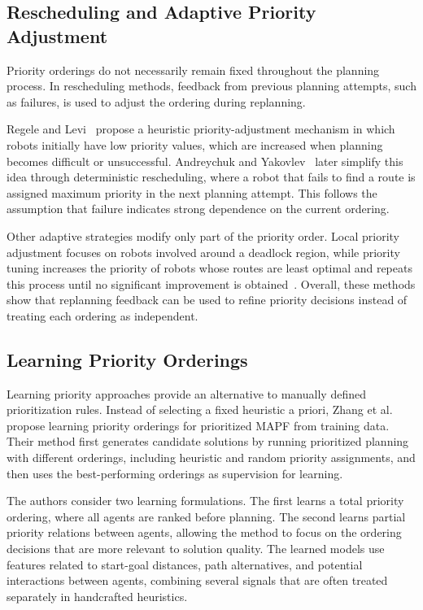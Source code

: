 \subsection{Rescheduling and Adaptive Priority Adjustment}
\hspace{\parindent}
Priority orderings do not necessarily remain fixed throughout the planning process. In rescheduling
methods, feedback from previous planning attempts, such as failures, is used to adjust the ordering during replanning.

Regele and Levi~\cite{regele2006cooperative} propose a heuristic priority-adjustment mechanism in
which robots initially have low priority values, which are increased when planning becomes difficult
or unsuccessful. Andreychuk and Yakovlev~\cite{andreychuk2018two} later simplify this idea through
deterministic rescheduling, where a robot that fails to find a route is assigned maximum priority in
the next planning attempt. This follows the assumption that failure indicates strong dependence on
the current ordering.

Other adaptive strategies modify only part of the priority order. Local priority adjustment focuses
on robots involved around a deadlock region, while priority tuning increases the priority of robots
whose routes are least optimal and repeats this process until no significant improvement is
obtained~\cite{machines2023survey}. Overall, these methods show that replanning feedback can be
used to refine priority decisions instead of treating each ordering as independent.

\subsection{Learning Priority Orderings}
\hspace{\parindent}
Learning priority approaches provide an alternative to manually defined prioritization rules. Instead
of selecting a fixed heuristic a priori, Zhang et al.~\cite{zhang2022learning} propose learning
priority orderings for prioritized MAPF from training data. Their method first generates candidate
solutions by running prioritized planning with different orderings, including heuristic and random
priority assignments, and then uses the best-performing orderings as supervision for learning.

The authors consider two learning formulations. The first learns a total priority ordering, where
all agents are ranked before planning. The second learns partial priority relations between agents,
allowing the method to focus on the ordering decisions that are more relevant to solution quality.
The learned models use features related to start-goal distances, path alternatives, and potential
interactions between agents, combining several signals that are often treated separately in
handcrafted heuristics.

